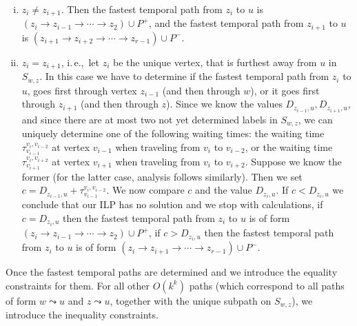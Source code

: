 \documentclass[a4paper,UKenglish,cleveref, autoref, thm-restate,anonymous]{lipics-v2021}
\newcommand{\ie}{i.\,e.,\ }
\begin{document}
\begin{enumerate}[(i)]
    \item \label{FPT:equality-fromUtoX-twosplit}
    $z_i \neq z_{i+1}$.
    Then the fastest temporal path from $z_i$ to $u$ is 
    $(z_i \rightarrow z_{i-1} \rightarrow \cdots \rightarrow z_2) \cup P^+$,
    and 
    the fastest temporal path from $z_{i+1}$ to $u$ is 
    $(z_{i+1} \rightarrow z_{i+2} \rightarrow \cdots \rightarrow z_{r-1}) \cup P^-$.
    \item \label{FPT:equality-fromUtoX-onesplit}
    $z_i = z_{i+1}$, \ie let $z_i$ be the unique vertex, that is furthest away from $u$ in $S_{w,z}$.
    In this case we have to determine if the fastest temporal path from $z_i$ to $u$, goes first through vertex $z_{i-1}$ (and then through $w$),
    or it goes first through $z_{i+1}$ (and then through $z$).
    Since we know the values $D_{z_{i-1},u}, D_{z_{i+1},u}$,
    and since there are at most two not yet determined labels in $S_{w,z}$,
    we can uniquely determine one of the following
    waiting times:
    the waiting time $\tau_{v_{i-1}} ^{v_{i}, v_{i-2}}$ at vertex $v_{i-1}$ when traveling from $v_i$ to $v_{i-2}$,
    or
    the waiting time $\tau_{v_{i+1}} ^{v_{i}, v_{i+2}}$ at vertex $v_{i+1}$ when traveling from $v_i$ to $v_{i+2}$.
    Suppose we know the former (for the latter case, analysis follows similarly).
    Then we set $c = D_{z_{i-1},u} +  \tau_{v_{i-1}} ^{v_{i}, v_{i-2}}$.
    We now compare $c$ and the value $D_{z_{i},u}$.
    If $c < D_{z_{i},u}$ we conclude that our ILP has no solution and we stop with calculations,
    if $c = D_{z_{i},u}$ then the fastest temporal path from $z_i$ to $u$ is of form $(z_i \rightarrow z_{i-1} \rightarrow \cdots \rightarrow z_2) \cup P^+$,
    if $c > D_{z_{i},u}$ then the fastest temporal path from $z_i$ to $u$ is of form $(z_i \rightarrow z_{i+1} \rightarrow \cdots \rightarrow z_{r-1}) \cup P^-$.
\end{enumerate}
Once the fastest temporal paths are determined and we introduce the equality constraints for them.
For all other $O(k^k)$ paths (which correspond to all paths of form $w \leadsto u$ and $z \leadsto u$, together with the unique subpath on $S_{w,z}$),
we introduce the inequality constraints.
\end{document}
